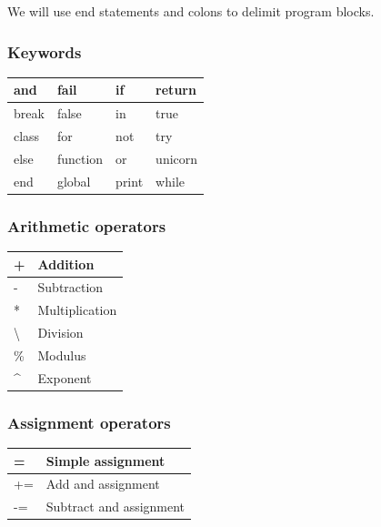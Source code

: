 \documentclass[a4paper,11pt]{article}
\begin{document}
We will use end statements and colons to delimit program blocks.

\begin{multicols}{2}

\subsubsection*{Keywords}
\begin{tabular}{| l | l | l | l | } \hline
  and & fail & if & return \\ \hline
  break & false & in & true \\ \hline
  class & for & not & try \\ \hline
  else & function & or & unicorn \\ \hline
  end & global &  print & while \\ \hline
\end{tabular}

\subsubsection*{Arithmetic operators}
\begin{tabular}{| l | l | } \hline
+ & Addition \\ \hline
- & Subtraction \\ \hline
* & Multiplication \\ \hline
\textbackslash & Division \\ \hline
\% & Modulus \\ \hline
\textasciicircum  & Exponent \\ \hline
\end{tabular}

\subsubsection*{Assignment operators}
\begin{tabular}{| l | l | } \hline
= & Simple assignment  \\ \hline
+= & Add and assignment  \\ \hline
-= & Subtract and assignment  \\ \hline
\end{tabular}


\end{multicols}
\end{document}
